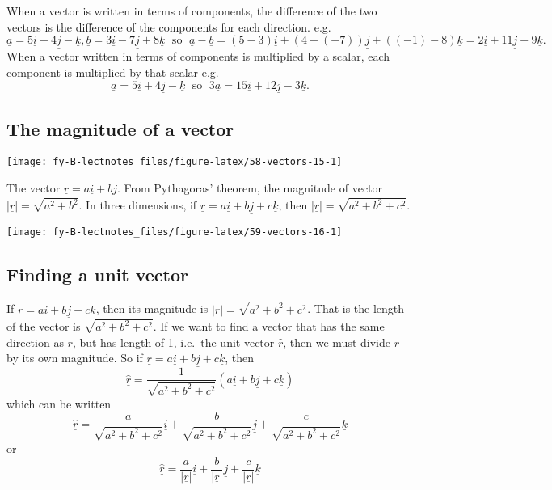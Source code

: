 \documentclass[
  11pt,
  oneside]{book}
\newcommand{\slide}{}
\theoremstyle{definition}
\theoremstyle{definition}
\theoremstyle{definition}
\theoremstyle{definition}
\theoremstyle{remark}
\begin{document}
When a vector is written in terms of components, the difference of the two vectors is the difference of the components for each direction. e.g.
\[
\underline a = 5\underline i + 4\underline j - \underline k, \underline b = 3\underline i - 7\underline j + 8\underline k\;\text{ so }\; \underline a - \underline b = (5 - 3)\underline i + (4 - (-7))\underline j + ((-1) - 8)\underline k = 2\underline i + 11\underline j -9\underline k.
\]
When a vector written in terms of components is multiplied by a scalar, each component is multiplied by that scalar e.g.
\[
\underline a = 5\underline i + 4\underline j - \underline k\;\text{ so }\;3\underline a = 15\underline i + 12\underline j - 3\underline k.
\]
\slide

\subsection{The magnitude of a vector}\label{the-magnitude-of-a-vector}

\begin{center}\texttt{[image: fy-B-lectnotes\_files/figure-latex/58-vectors-15-1]} \end{center}

The vector \(\underline r = a\underline i + b\underline j\). From Pythagoras' theorem, the magnitude of vector \(|\underline r| = \sqrt{a^2+b^2}\). In three dimensions, if \(\underline r = a\underline i + b\underline j + c\underline k\), then \(|\underline r| = \sqrt{a^2+b^2+c^2}\).

\begin{center}\texttt{[image: fy-B-lectnotes\_files/figure-latex/59-vectors-16-1]} \end{center}

\slide

\subsection{Finding a unit vector}\label{finding-a-unit-vector}

If \(\underline r = a\underline i + b\underline j + c\underline k\), then its magnitude is \(|r| = \sqrt{a^2+b^2+c^2}\). That is the length of the vector is \(\sqrt{a^2+b^2+c^2}\). If we want to find a vector that has the same direction as \(\underline r\), but has length of 1, i.e.~the unit vector \(\underline{\hat r}\), then we must divide \(\underline r\) by its own magnitude. So if \(\underline r = a\underline i + b\underline j + c\underline k\), then
\[
\underline{\hat r} = \frac{1}{\sqrt{a^2+b^2+c^2}}(a\underline i+b\underline j+c\underline k)
\]
which can be written
\[
\underline{\hat r} = \frac{a}{\sqrt{a^2+b^2+c^2}}\underline i+\frac{b}{\sqrt{a^2+b^2+c^2}}\underline j+\frac{c}{\sqrt{a^2+b^2+c^2}}\underline k
\]
or
\[
\underline{\hat r} = \frac{a}{|\underline r|}\underline i+\frac{b}{|\underline r|}\underline j+\frac{c}{|\underline r|}\underline k
\]
\slide
\end{document}
